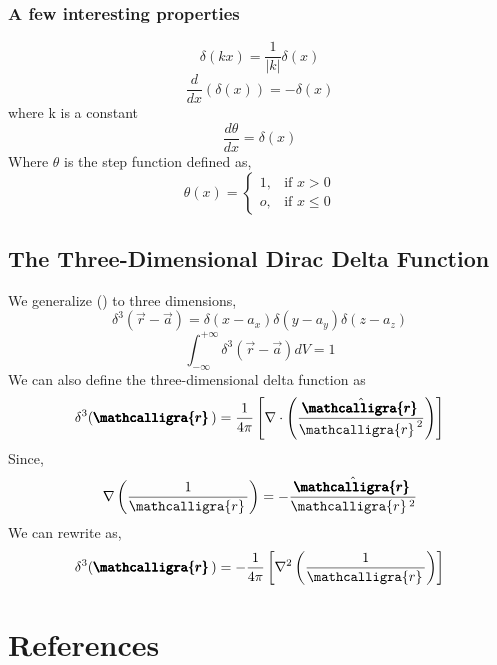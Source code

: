 \documentclass[]{article}
\newcommand{\scriptr}{\mathcalligra{r}\,}
\newcommand{\boldscriptr}{\pmb{\mathcalligra{r}}\,}
\begin{document}
\subsubsection{A few interesting properties}
\begin{equation}
	\delta(kx) = \frac{1}{|k|}\delta(x)
\end{equation}
\begin{equation}
	\frac{d}{dx}(\delta(x)) = -\delta(x)
\end{equation}
where k is a constant
\begin{equation}
	\frac{d \theta}{dx} = \delta(x)
\end{equation}
Where $\theta$ is the step function defined as,
\begin{equation}
	\theta(x)= 
	\begin{cases}
		1, & \text{if } x > 0\\
		o,              & \text{if } x \leq 0
	\end{cases}
\end{equation}

\subsection{The Three-Dimensional Dirac Delta Function}
We generalize () to three dimensions,
\begin{equation}
	\delta^{3}(\vec{r} - \vec{a}) = \delta(x-a_{x})\delta(y-a_{y})\delta(z-a_{z})
\end{equation}
\begin{equation}
	\int_{- \infty}^{+ \infty} \delta^{3}(\vec{r} - \vec{a}) dV = 1
\end{equation}
We can also define the three-dimensional delta function as
\begin{equation}
	\delta^{3}(\boldscriptr) = \frac{1}{4 \pi} \left[\nabla \cdot \left( \frac{\hat{\boldscriptr}}{{\scriptr	}^{2}}\right)\right]
\end{equation}
Since,
$$\nabla \left(\frac{1}{\scriptr}\right) = -\frac{\hat{\boldscriptr}}{\scriptr^{2}}$$
We can rewrite as,
\begin{equation}
	\delta^{3}(\boldscriptr) = -\frac{1}{4 \pi} \left[\nabla^{2}  \left( \frac{1}{\scriptr}\right)\right]
\end{equation}
\section*{References}
\end{document}
